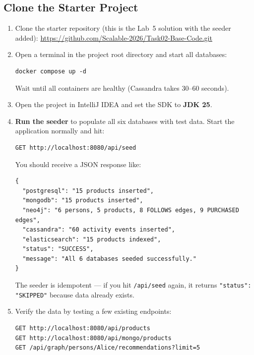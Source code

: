 \documentclass[a4paper]{article}
\begin{document}
\subsection*{Clone the Starter Project}
\begin{enumerate}
  \item Clone the starter repository (this is the Lab~5 solution with the seeder added): \url{https://github.com/Scalable-2026/Task02-Base-Code.git}
  \item Open a terminal in the project root directory and start all databases:
    \begin{lstlisting}
docker compose up -d
    \end{lstlisting}
    Wait until all containers are healthy (Cassandra takes 30--60 seconds).
  \item Open the project in IntelliJ IDEA and set the SDK to \textbf{JDK 25}.
  \item \textbf{Run the seeder} to populate all six databases with test data. Start the application normally and hit:
    \begin{lstlisting}
GET http://localhost:8080/api/seed
    \end{lstlisting}
    You should receive a JSON response like:
    \begin{verbatim}
{
  "postgresql": "15 products inserted",
  "mongodb": "15 products inserted",
  "neo4j": "6 persons, 5 products, 8 FOLLOWS edges, 9 PURCHASED edges",
  "cassandra": "60 activity events inserted",
  "elasticsearch": "15 products indexed",
  "status": "SUCCESS",
  "message": "All 6 databases seeded successfully."
}
    \end{verbatim}
    The seeder is idempotent --- if you hit \texttt{/api/seed} again, it returns \texttt{"status": "SKIPPED"} because data already exists.
  \item Verify the data by testing a few existing endpoints:
    \begin{lstlisting}
GET http://localhost:8080/api/products
GET http://localhost:8080/api/mongo/products
GET /api/graph/persons/Alice/recommendations?limit=5
    \end{lstlisting}
\end{enumerate}
\end{document}
